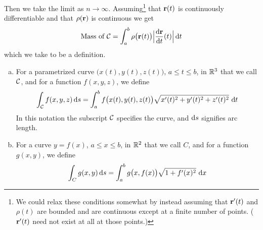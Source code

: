 Then we take the limit as $n\rightarrow\infty$. 
Assuming\footnote{We could
relax these conditions somewhat by instead assuming that $\mathbf{r}'(t)$ 
and $\rho(t)$ are bounded and are continuous except at a finite number
of points. ($\mathbf{r}'(t)$ need not exist at all at those points.)}
 that $\mathbf{r}(t)$ is continuously differentiable and that $\rho(\mathbf{r})$ 
is continuous we get
\begin{equation*}
\text{Mass of $\cC$} = \int_a^b \rho\big(\vr(t)\big) \Big|\diff{\vr}{t}(t)\Big|\,\dee{t}
\end{equation*}
which we take to be a definition.
\begin{defn}\label{def:lineIntegral}
\begin{enumerate}[(a)]
\item
For a parametrized curve $\big(x(t),y(t), z(t)\big)$, $a\le t\le b$,
in $\mathbb{R}^3$ that we call $\mathcal{C}$, and for a function $f(x,y,z)$, we define
\begin{equation*}
\int_\cC f(x,y,z)\,\dee{s} 
 =\int_a^b f\big(x(t), y(t) , z(t) \big)\sqrt{x'(t)^2+y'(t)^2+z'(t)^2}\ 
       \dee{t}
\end{equation*}
In this notation the subscript $\mathcal{C}$ specifies the curve, and $\mathrm{d}s$
signifies arc length.

\item  
For a curve $y=f(x)$, $a\le x\le b$, in $\mathbb{R}^2$ that we call $C$, 
and for a function $g(x,y)$, we define
\begin{equation*}
\int_C g(x,y)\,\dee{s} 
 =\int_a^b g\big(x, f(x) \big)\sqrt{1+f'(x)^2}\ 
       \dee{x}
\end{equation*}
\end{enumerate}
\end{defn}


